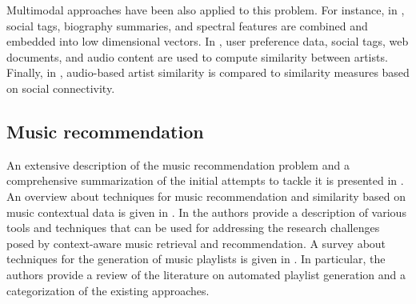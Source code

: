 Multimodal approaches have been also applied to this problem. For instance, in \cite{mcfee2009heterogeneous}, social tags, biography summaries, and spectral features are combined and embedded into low dimensional vectors. In \cite{kim2009using}, user preference data, social tags, web documents, and audio content are used to compute similarity between artists. Finally, in \cite{fields2008you}, audio-based artist similarity is compared to similarity measures based on social connectivity.

\subsection{Music recommendation}
\label{sec:SOA:mir:music-recommendation}

An extensive description of the music recommendation problem and a comprehensive summarization of the initial attempts to tackle it is presented in \citep{oscarBook}. An overview about techniques for music recommendation and similarity based on music contextual data is given in \citep{Knees2013}. 
In \citep{KaminskasR12} the authors provide a description of various tools and techniques that can be used for addressing the research
challenges posed by context-aware music retrieval and recommendation. 
A survey about techniques for the generation of music playlists is given in \citep{Bonnin2014}. In particular, the authors provide a review of the literature on automated playlist generation and a categorization of the existing approaches. 



